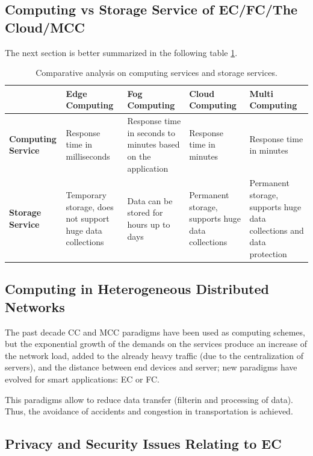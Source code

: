 \documentclass[10pt]{article}
\begin{document}
\subsection{Computing vs Storage Service of EC/FC/The Cloud/MCC}

The next section is better summarized in the following table
\hyperref[comparative]{\ref{comparative}}.

\begin{table}[h!]
 \begin{center}
  \begin{tabular}
      { | p{1.6cm} | p{2.3cm} | p{2.3cm} | p{2.3cm} | p{2.3cm} | }
  \hline
      & Edge Computing & Fog Computing & Cloud Computing & Multi Computing \\
  \hline
   \bf{Computing Service} 
      & Response time in milliseconds  
      & Response time in seconds to minutes based on the application 
      & Response time in minutes
      & Response time in minutes 
      \\
  \hline
   \bf{Storage Service}
      & Temporary storage, does not support huge data collections
      & Data can be stored for hours up to days
      & Permanent storage, supports huge data collections
      & Permanent storage, supports huge data collections and data protection
      \\
  \hline
  \end{tabular}
 \caption{Comparative analysis on computing services and storage services.
         \label{comparative}}
 \end{center}
\end{table}

\subsection{Computing in Heterogeneous Distributed Networks}

The past decade CC and MCC paradigms have been used as computing schemes, but
the exponential growth of the demands on the services produce an increase of the
network load, added to the already heavy traffic (due to the centralization of
servers), and the distance between end devices and server; new paradigms have
evolved for smart applications: EC or FC.

This paradigms allow to reduce data transfer (filterin and processing of data).
Thus, the avoidance of accidents and congestion in transportation is achieved.

\subsection{Privacy and Security Issues Relating to EC}
\end{document}
